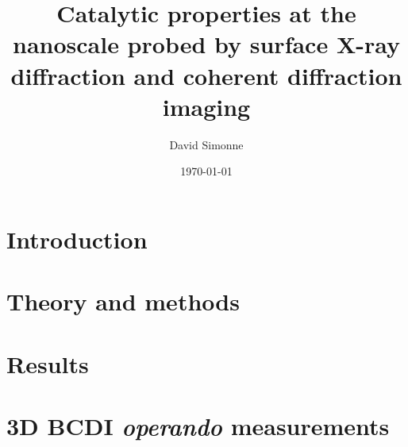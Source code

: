 \documentclass[11pt]{report}
\title{Catalytic properties at the nanoscale probed by surface X-ray diffraction and coherent diffraction imaging}
\author{David Simonne}
\date{\today}
\begin{document}
    


\frontmatter
{\hypersetup{linkcolor=black}
    \tableofcontents
    \listoffigures
    \listoftables
}

\mainmatter
    \chapter{Introduction} 
    
     
    \chapter{Theory and methods}
    
    
    
    
    
    
    
    \chapter{Results}
    
    
    
    
    
%     
    
    \printbibliography

    \appendix
    \chapter{3D BCDI \textit{operando} measurements}
    




\end{document}

